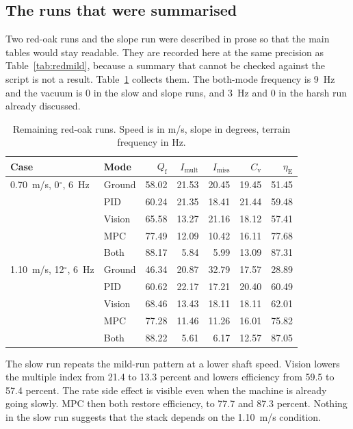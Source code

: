 \subsection{The runs that were summarised}

Two red-oak runs and the slope run were described in prose so that the main tables would stay readable. They are recorded here at the same precision as Table~\ref{tab:redmild}, because a summary that cannot be checked against the script is not a result. Table~\ref{tab:rest} collects them. The both-mode frequency is 9~Hz and the vacuum is 0 in the slow and slope runs, and 3~Hz and 0 in the harsh run already discussed.

\begin{table}[htbp]
\centering
\caption{Remaining red-oak runs. Speed is in m/s, slope in degrees, terrain frequency in Hz.}
\label{tab:rest}
\begin{tabular}{@{}llrrrrr@{}}
\toprule
Case & Mode & $Q_{\mathrm{f}}$ & $I_{\mathrm{mult}}$ & $I_{\mathrm{miss}}$ & $C_{\mathrm{v}}$ & $\eta_{\mathrm{E}}$ \\
\midrule
0.70~m/s, 0$^\circ$, 6~Hz & Ground & 58.02 & 21.53 & 20.45 & 19.45 & 51.45 \\
 & PID & 60.24 & 21.35 & 18.41 & 21.44 & 59.48 \\
 & Vision & 65.58 & 13.27 & 21.16 & 18.12 & 57.41 \\
 & MPC & 77.49 & 12.09 & 10.42 & 16.11 & 77.68 \\
 & Both & 88.17 & 5.84 & 5.99 & 13.09 & 87.31 \\
\midrule
1.10~m/s, 12$^\circ$, 6~Hz & Ground & 46.34 & 20.87 & 32.79 & 17.57 & 28.89 \\
 & PID & 60.62 & 22.17 & 17.21 & 20.40 & 60.49 \\
 & Vision & 68.46 & 13.43 & 18.11 & 18.11 & 62.01 \\
 & MPC & 77.28 & 11.46 & 11.26 & 16.01 & 75.82 \\
 & Both & 88.22 & 5.61 & 6.17 & 12.57 & 87.05 \\
\bottomrule
\end{tabular}
\end{table}

The slow run repeats the mild-run pattern at a lower shaft speed. Vision lowers the multiple index from 21.4 to 13.3 percent and lowers efficiency from 59.5 to 57.4 percent. The rate side effect is visible even when the machine is already going slowly. MPC then both restore efficiency, to 77.7 and 87.3 percent. Nothing in the slow run suggests that the stack depends on the 1.10~m/s condition.

